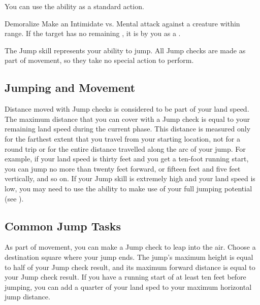          You can use the  ability as a standard action.
        \begin{activeability}{Demoralize}
            \rankline
            Make an Intimidate vs. Mental attack against a creature within \rngmed range.
            \hit If the target has no remaining , it is \frightened by you as a .
        \end{activeability}

\newpage
{}
    The Jump skill represents your ability to jump.
    All Jump checks are made as part of movement, so they take no special action to perform.

    \subsection{Jumping and Movement}
    Distance moved with Jump checks is considered to be part of your land speed.
    The maximum distance that you can cover with a Jump check is equal to your remaining land speed during the current phase.
    This distance is measured only for the farthest extent that you travel from your starting location, not for a round trip or for the entire distance travelled along the arc of your jump.
    For example, if your land speed is thirty feet and you get a ten-foot running start, you can jump no more than twenty feet forward, or fifteen feet and five feet vertically, and so on.
    If your Jump skill is extremely high and your land speed is low, you may need to use the  ability to make use of your full jumping potential (see ).

    \subsection{Common Jump Tasks}
         As part of movement, you can make a Jump check to leap into the air.
        Choose a destination square where your jump ends.
        The jump's maximum height is equal to half of your Jump check result, and its maximum forward distance is equal to your Jump check result.
        If you have a running start of at least ten feet before jumping, you can add a quarter of your land sped to your maximum horizontal jump distance.

